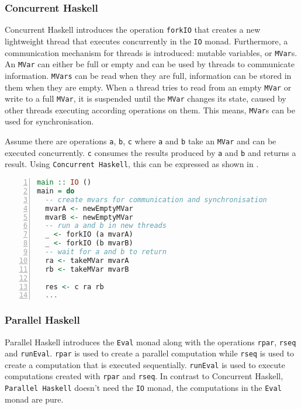 \subsubsection{Concurrent Haskell}
\vspace*{-0.5em}
\textsf{Concurrent Haskell} introduces the operation \texttt{forkIO} that creates a new lightweight thread that executes concurrently in the \texttt{IO} monad. Furthermore, a communication mechanism for threads is introduced: mutable variables, or \texttt{MVar}s. An \texttt{MVar} can either be full or empty and can be used by threads to communicate information. \texttt{MVars} can be read when they are full, information can be stored in them when they are empty. When a thread tries to read from an empty \texttt{MVar} or write to a full \texttt{MVar}, it is suspended until the \texttt{MVar} changes its state, caused by other threads executing according operations on them. This means, \texttt{MVar}s can be used for synchronisation.

Assume there are operations \texttt{a}, \texttt{b}, \texttt{c} where \texttt{a} and \texttt{b} take an \texttt{MVar} and can be executed concurrently. \texttt{c} consumes the results produced by \texttt{a} and \texttt{b} and returns a result. Using \texttt{Concurrent Haskell}, this can be expressed as shown in .

\begin{lstlisting}[language=Haskell, numbers=left, frame=bt, label=lst:example_concurrent_haskell, caption={Parallel and sequential composition in \textsf{Concurrent Haskell}.}]
main :: IO ()
main = do
  -- create mvars for communication and synchronisation
  mvarA <- newEmptyMVar
  mvarB <- newEmptyMVar  
  -- run a and b in new threads
  _ <- forkIO (a mvarA)
  _ <- forkIO (b mvarB)  
  -- wait for a and b to return
  ra <- takeMVar mvarA
  rb <- takeMVar mvarB
  
  res <- c ra rb
  ...
\end{lstlisting}

\vspace*{-1em}
\subsubsection{Parallel Haskell}
\vspace*{-0.5em}
\textsf{Parallel Haskell} introduces the \texttt{Eval} monad along with the operations \texttt{rpar}, \texttt{rseq} and \texttt{runEval}. \texttt{rpar} is used to create a parallel computation while \texttt{rseq} is used to create a computation that is executed sequentially. \texttt{runEval} is used to execute computations created with \texttt{rpar} and \texttt{rseq}. In contrast to \textsf{Concurrent Haskell}, \texttt{Parallel Haskell} doesn't need the \texttt{IO} monad, the computations in the \texttt{Eval} monad are pure.

